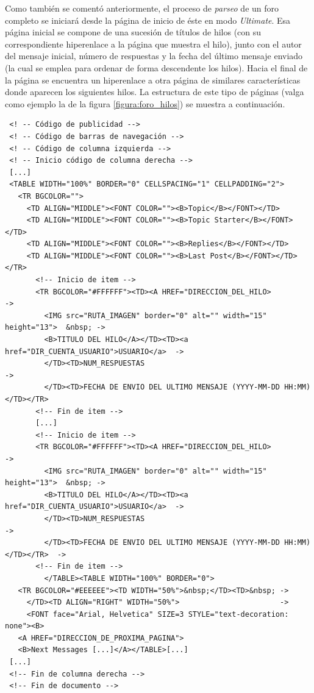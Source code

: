 Como también se comentó anteriormente, el proceso de \textit{parseo} de un foro
completo se iniciará desde la página de inicio de éste en modo \textit{Ultimate}.
Esa página inicial se compone de una sucesión de títulos de hilos (con su
correspondiente hiperenlace a la página que muestra el hilo), junto con el autor
del mensaje inicial, número de respuestas y la fecha del último mensaje enviado
(la cual se emplea para ordenar de forma descendente los hilos). Hacia el final
de la página se encuentra un hiperenlace a otra página de similares
características donde aparecen los siguientes hilos.
La estructura de este tipo de páginas (valga como ejemplo la de la figura
\ref{figura:foro_hilos}) se muestra a continuación.

{\scriptsize
  \begin{verbatim}
 <! -- Código de publicidad -->
 <! -- Código de barras de navegación -->
 <! -- Código de columna izquierda -->
 <! -- Inicio código de columna derecha -->
 [...]
 <TABLE WIDTH="100%" BORDER="0" CELLSPACING="1" CELLPADDING="2">
   <TR BGCOLOR="">
     <TD ALIGN="MIDDLE"><FONT COLOR=""><B>Topic</B></FONT></TD>
     <TD ALIGN="MIDDLE"><FONT COLOR=""><B>Topic Starter</B></FONT></TD>
     <TD ALIGN="MIDDLE"><FONT COLOR=""><B>Replies</B></FONT></TD>
     <TD ALIGN="MIDDLE"><FONT COLOR=""><B>Last Post</B></FONT></TD></TR>
       <!-- Inicio de item -->
       <TR BGCOLOR="#FFFFFF"><TD><A HREF="DIRECCION_DEL_HILO>                     ->
         <IMG src="RUTA_IMAGEN" border="0" alt="" width="15" height="13">  &nbsp; ->
         <B>TITULO DEL HILO</A></TD><TD><a href="DIR_CUENTA_USUARIO">USUARIO</a>  ->
         </TD><TD>NUM_RESPUESTAS                                                  ->
         </TD><TD>FECHA DE ENVIO DEL ULTIMO MENSAJE (YYYY-MM-DD HH:MM)</TD></TR>
       <!-- Fin de item -->
       [...]
       <!-- Inicio de item -->
       <TR BGCOLOR="#FFFFFF"><TD><A HREF="DIRECCION_DEL_HILO>                     ->
         <IMG src="RUTA_IMAGEN" border="0" alt="" width="15" height="13">  &nbsp; ->
         <B>TITULO DEL HILO</A></TD><TD><a href="DIR_CUENTA_USUARIO">USUARIO</a>  ->
         </TD><TD>NUM_RESPUESTAS                                                  ->
         </TD><TD>FECHA DE ENVIO DEL ULTIMO MENSAJE (YYYY-MM-DD HH:MM)</TD></TR>  ->
       <!-- Fin de item -->
         </TABLE><TABLE WIDTH="100%" BORDER="0">
   <TR BGCOLOR="#EEEEEE"><TD WIDTH="50%">&nbsp;</TD><TD>&nbsp; ->
     </TD><TD ALIGN="RIGHT" WIDTH="50%">                       ->
     <FONT face="Arial, Helvetica" SIZE=3 STYLE="text-decoration: none"><B>
   <A HREF="DIRECCION_DE_PROXIMA_PAGINA">
   <B>Next Messages [...]</A></TABLE>[...]
 [...]
 <!-- Fin de columna derecha -->
 <!-- Fin de documento -->
\end{verbatim}
}

